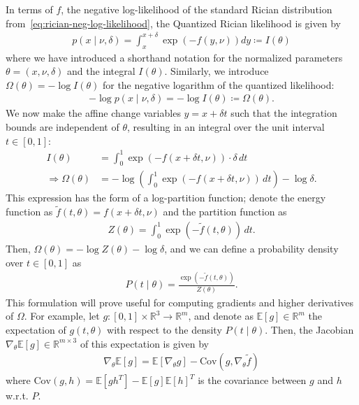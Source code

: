 \documentclass{article}
\begin{document}
In terms of $f$, the negative log-likelihood of the standard Rician distribution from~\eqref{eq:rician-neg-log-likelihood}, the Quantized Rician likelihood is given by
%
\begin{align}
  p(x \mid \nu, \delta) = \int_x^{x+\delta} \exp(-f(y, \nu)) dy \coloneqq I(\theta)
\end{align}
%
where we have introduced a shorthand notation for the normalized parameters $\theta = (x, \nu, \delta)$ and the integral $I(\theta)$.
Similarly, we introduce $\Omega(\theta) = -\log I(\theta)$ for the negative logarithm of the quantized likelihood:
%
\begin{align}
  -\log p(x \mid \nu, \delta) = -\log I(\theta) \coloneqq \Omega(\theta).
\end{align}
%
We now make the affine change variables $y = x + \delta t$ such that the integration bounds are independent of $\theta$, resulting in an integral over the unit interval $t \in [0, 1]$:
%
\begin{align}
  I(\theta)                  & = \int_0^1 \exp(-f(x + \delta t, \nu)) \cdot \delta \, dt                    \\
  \Rightarrow \Omega(\theta) & = -\log\left(\int_0^1 \exp(-f(x + \delta t, \nu)) \, dt\right) - \log\delta.
\end{align}
%
This expression has the form of a log-partition function;
denote the energy function as $\tilde{f}(t, \theta) = f(x + \delta t, \nu)$ and the partition function as
%
\begin{align}
  Z(\theta) = \int_0^1 \exp(-\tilde{f}(t, \theta)) \, dt.
\end{align}
%
Then, $\Omega(\theta) = -\log Z(\theta) - \log\delta$, and we can define a probability density over $t \in [0,1]$ as
%
\begin{align}
  P(t \mid \theta) = \frac{\exp(-\tilde{f}(t, \theta))}{Z(\theta)}.
\end{align}
%
This formulation will prove useful for computing gradients and higher derivatives of $\Omega$.
For example, let $g : [0, 1] \times \mathbb{R}^3 \to \mathbb{R}^m$, and denote as $\mathbb{E}[g] \in \mathbb{R}^m$ the expectation of $g(t, \theta)$ with respect to the density $P(t \mid \theta)$.
Then, the Jacobian $\nabla_\theta \mathbb{E}[g] \in \mathbb{R}^{m \times 3}$ of this expectation is given by
%
\begin{align}\label{eq:gradient-expectation-covariance}
  \nabla_\theta \mathbb{E}[g] = \mathbb{E}[\nabla_\theta g] - \mathrm{Cov}(g, \nabla_\theta \tilde{f})
\end{align}
%
where $\mathrm{Cov}(g, h) = \mathbb{E}[g h^T] - \mathbb{E}[g]\mathbb{E}[h]^T$ is the covariance between $g$ and $h$ w.r.t. $P$.
\end{document}
